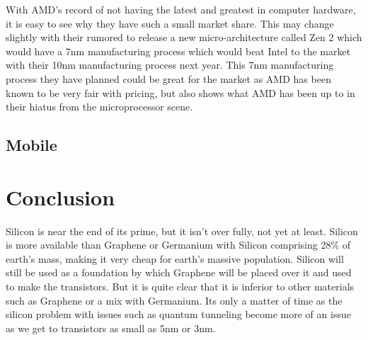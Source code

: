 \documentclass[journal]{IEEEtran}
\begin{document}
With AMD's record of not having the latest and greatest in computer hardware, it is easy to see why they have such a small market share. This may change slightly with their rumored to release a new micro-architecture called Zen 2 which would have a 7nm manufacturing process which would beat Intel to the market with their 10nm manufacturing process next year. This 7nm manufacturing process they have planned could be great for the market as AMD has been known to be very fair with pricing, but also shows what AMD has been up to in their hiatus from the microprocessor scene.

\subsection{Mobile}


\section{Conclusion}
Silicon is near the end of its prime, but it isn't over fully, not yet at least. Silicon is more available than Graphene or Germanium with Silicon comprising 28\% of earth's mass, making it very cheap for earth's massive population. Silicon will still be used as a foundation by which Graphene will be placed over it and used to make the transistors. But it is quite clear that it is inferior to other materials such as Graphene or a mix with Germanium. Its only a matter of time as the silicon problem with issues such as quantum tunneling become more of an issue as we get to transistors as small as 5nm or 3nm.

\printbibliography
\end{document}

